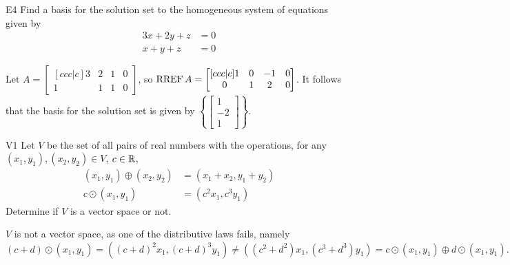 \documentclass{sbgLAquiz}
\begin{document}
\begin{extract}\newpage\end{extract}
\begin{problem}{E4}
Find a basis for the solution set to the homogeneous system of equations
given by
\begin{align*}
3x+2y+z &= 0 \\
x+y+z &= 0
\end{align*}
\end{problem}
\begin{solution}
Let \(A =
  \begin{bmatrix}[ccc|c]
    3 & 2 & 1 & 0 \\
    1 & 1 & 1 & 0
  \end{bmatrix}
\), so \(\operatorname{RREF} A =
  \begin{bmatrix}[ccc|c]
    1 & 0 & -1 & 0 \\
    0 & 1 & 2 & 0
  \end{bmatrix}
\).
It follows that the basis for the solution set is given by \(\left\{
  \begin{bmatrix}
    1 \\
    -2 \\
    1
  \end{bmatrix}
\right\}\).
\end{solution}

\begin{problem}{V1}
Let $V$ be the set of all pairs of real numbers with the operations, for any $(x_1,y_1), (x_2,y_2) \in V$, $c \in \mathbb{R}$,
\begin{align*}
(x_1,y_1) \oplus (x_2,y_2) &= (x_1+x_2,y_1+y_2) \\
c \odot (x_1,y_1) &= (c^2x_1, c^3y_1)
\end{align*}
Determine if $V$ is a vector space or not.
\end{problem}
\begin{solution}
$V$ is not a vector space, as one of the distributive laws fails, namely
$$(c+d) \odot (x_1,y_1) = ( (c+d)^2 x_1, (c+d)^3 y_1) \neq ((c^2+d^2)x_1, (c^3+d^3)y_1) = c \odot (x_1,y_1) \oplus d \odot (x_1,y_1).$$
\end{solution}
\end{document}
